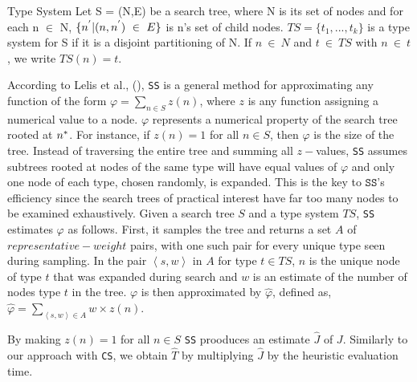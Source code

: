 \begin{definition}{Type System}
Let S = (N,E) be a search tree, where N is its set of nodes and  for each n $\in$ N, $\{n\sp{'}|(n,n\sp{'})\ \in\ E \}$ is n's set of child nodes. $TS = \{t_{1},...,t_{k} \}$ is a type system for S if it is a disjoint partitioning of N. If $n\ \in\ N$ and $t\ \in\ TS$ with $n\ \in\ t$, we write $TS(n) = t$.
\end{definition}

According to Lelis et al., (\citeyear{lelis2013predicting}), \texttt{SS} is a general method for approximating any function of the form $\varphi = \sum_{n \in S}z(n)$, where $z$ is any function assigning a numerical value to a node.  $\varphi$ represents a numerical property of the search tree rooted at $n\sp{*}$. For instance, if $z(n)=1$ for all $n \in S$, then $\varphi$ is the size of the tree. Instead of traversing the entire tree and summing all $z-$values, \texttt{SS} assumes subtrees rooted at nodes of the same type will have equal values of $\varphi$ and only one node of each type, chosen randomly, is expanded. This is the key to $\texttt{SS}$'s efficiency since the search trees of practical interest have far too many nodes to be examined exhaustively. Given a search tree $S$ and a type system $TS$, \texttt{SS} estimates $\varphi$ as follows. First, it samples the tree and returns a set $A$ of $representative-weight$ pairs, with one such pair for every unique type seen during sampling. In the pair $\left\langle s,w \right\rangle$ in $A$ for type $t \in TS$, $n$ is the unique node of type $t$ that was expanded during search and $w$ is an estimate of the number of nodes type $t$ in the tree. $\varphi$ is then approximated by $\hat{\varphi}$, defined as, $\hat{\varphi} =  \sum_{\left\langle s,w \right\rangle \in A}w \times z(n)$. 

By making $z(n) = 1$ for all $n \in S$ \texttt{SS} prooduces an estimate $\hat{J}$ of $J$. Similarly to our approach with \texttt{CS}, we obtain $\hat{T}$ by multiplying $\hat{J}$ by the heuristic evaluation time.


